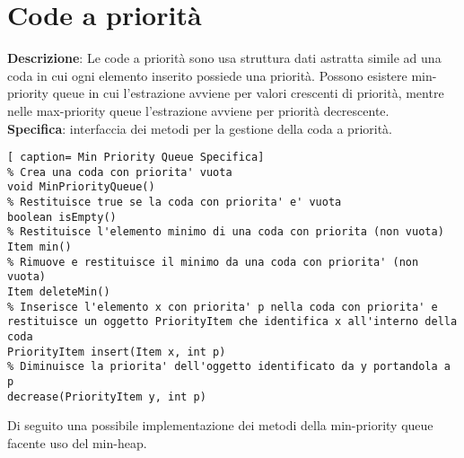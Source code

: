 \documentclass[../cheatSheetAlgoritmi.tex]{subfiles}
\begin{document}
\section{Code a priorità}
\textbf{Descrizione}: Le code a priorità sono usa struttura dati astratta simile ad una coda in cui ogni elemento inserito possiede una priorità. Possono esistere min-priority queue in cui l'estrazione avviene per valori crescenti di priorità, mentre nelle max-priority queue l'estrazione avviene per priorità decrescente.\\
\textbf{Specifica}: interfaccia dei metodi per la gestione della coda a priorità.\
\begin{lstlisting}[ caption= Min Priority Queue Specifica]
% Crea una coda con priorita' vuota
void MinPriorityQueue()
% Restituisce true se la coda con priorita' e' vuota
boolean isEmpty()  
% Restituisce l'elemento minimo di una coda con priorita (non vuota)
Item min()  
% Rimuove e restituisce il minimo da una coda con priorita' (non vuota)
Item deleteMin()  
% Inserisce l'elemento x con priorita' p nella coda con priorita' e restituisce un oggetto PriorityItem che identifica x all'interno della coda
PriorityItem insert(Item x, int p)
% Diminuisce la priorita' dell'oggetto identificato da y portandola a p	
decrease(PriorityItem y, int p) 
\end{lstlisting}
Di seguito una possibile implementazione dei metodi della min-priority queue facente uso del min-heap.
\end{document}

